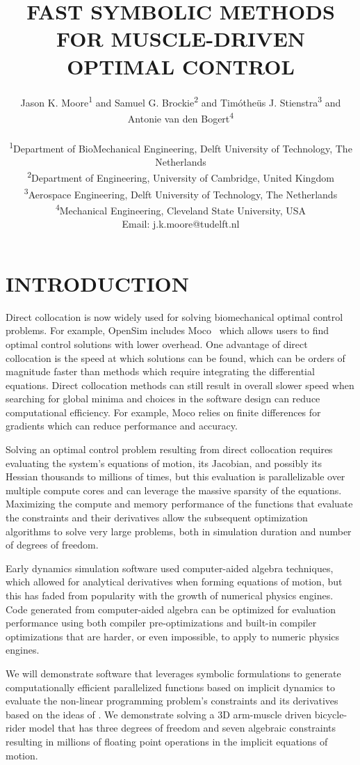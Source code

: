\documentclass[11pt,twocolumn]{article}
\title{\normalsize\textbf{
  FAST SYMBOLIC METHODS FOR MUSCLE-DRIVEN OPTIMAL CONTROL
}}
\author{
Jason K. Moore\textsuperscript{1} and
Samuel G. Brockie\textsuperscript{2} and
Timótheüs J. Stienstra\textsuperscript{3} and
Antonie van den Bogert\textsuperscript{4} \\
\\
\small
\textsuperscript{1}Department of BioMechanical Engineering, Delft University of Technology, The Netherlands\\
\textsuperscript{2}Department of Engineering, University of Cambridge, United Kingdom\\
\textsuperscript{3}Aerospace Engineering, Delft University of Technology, The Netherlands\\
\textsuperscript{4}Mechanical Engineering, Cleveland State University, USA\\
Email: j.k.moore@tudelft.nl}
\date{}
\begin{document}
\pagestyle{fancy}
\lhead{}
\fancyfoot{}
\maketitle
\section*{INTRODUCTION}
\vspace{-1em}
%
Direct collocation is now widely used for solving biomechanical optimal control
problems. For example, OpenSim includes Moco~\cite{Dembia2020} which allows
users to find optimal control solutions with lower overhead. One advantage of
direct collocation is the speed at which solutions can be found, which can be
orders of magnitude faster than methods which require integrating the
differential equations. Direct collocation methods can still result in overall
slower speed when searching for global minima and choices in the software
design can reduce computational efficiency. For example, Moco relies on finite
differences for gradients which can reduce performance and accuracy.

Solving an optimal control problem resulting from direct collocation requires
evaluating the system's equations of motion, its Jacobian, and possibly its
Hessian thousands to millions of times, but this evaluation is parallelizable
over multiple compute cores and can leverage the massive sparsity of the
equations. Maximizing the compute and memory performance of the functions that
evaluate the constraints and their derivatives allow the subsequent
optimization algorithms to solve very large problems, both in simulation
duration and number of degrees of freedom.

Early dynamics simulation software used computer-aided algebra techniques,
which allowed for analytical derivatives when forming equations of motion, but
this has faded from popularity with the growth of numerical physics engines.
Code generated from computer-aided algebra can be optimized for evaluation
performance using both compiler pre-optimizations and built-in compiler
optimizations that are harder, or even impossible, to apply to numeric physics
engines.

We will demonstrate software that leverages symbolic formulations to generate
computationally efficient parallelized functions based on implicit dynamics to
evaluate the non-linear programming problem's constraints and its derivatives
based on the ideas of \cite{vandenBogert2011a}. We demonstrate solving a 3D
arm-muscle driven bicycle-rider model that has three degrees of freedom and
seven algebraic constraints resulting in millions of floating point operations
in the implicit equations of motion.
\end{document}
